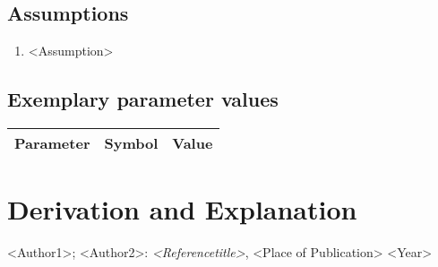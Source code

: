\documentclass[10pt,a4paper]{article}
\begin{document}
	
	\subsection{Assumptions} %
		\begin{enumerate} %
			\item <Assumption>
		\end{enumerate}
	
	
	\subsection{Exemplary parameter values}
	\begin{tabular}{lcl} 
		Parameter & Symbol & Value \\ \hline	
	\end{tabular}

	
	\section{Derivation and Explanation} %
	
	
	\begin{thebibliography}{10}		
		<Author1>; <Author2>: 
		\textit{<Referencetitle>}, <Place of Publication> <Year>
	\end{thebibliography}
\end{document}

